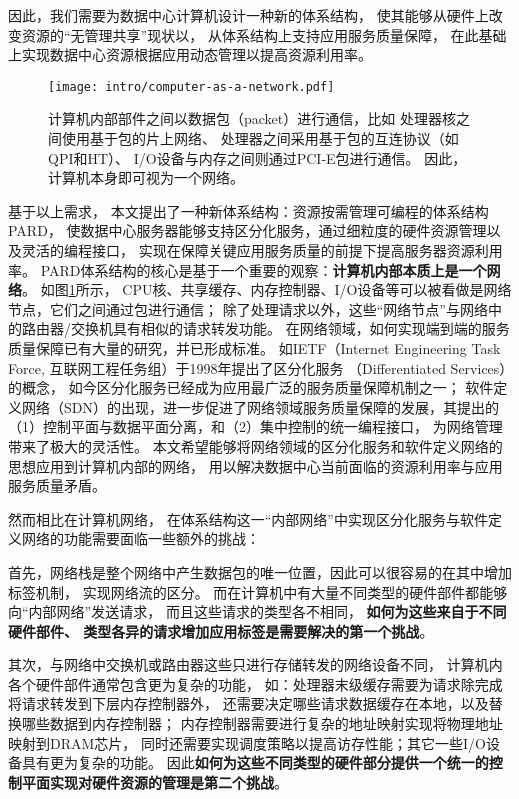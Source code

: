 因此，我们需要为数据中心计算机设计一种新的体系结构，
使其能够从硬件上改变资源的``无管理共享''现状以，
从体系结构上支持应用服务质量保障，
在此基础上实现数据中心资源根据应用动态管理以提高资源利用率。

\begin{figure}[H]
  \centering
  \texttt{[image: intro/computer-as-a-network.pdf]}
  \caption[计算机内部本质是一个网络]{
    计算机内部部件之间以数据包（packet）进行通信，比如
    处理器核之间使用基于包的片上网络、
    处理器之间采用基于包的互连协议（如QPI和HT）、
    I/O设备与内存之间则通过PCI-E包进行通信。
    因此，计算机本身即可视为一个网络。}
  \label{fig:computer-as-a-network}
\end{figure}

基于以上需求，
本文提出了一种新体系结构：资源按需管理可编程的体系结构PARD\cite{pard:2015}，
使数据中心服务器能够支持区分化服务，通过细粒度的硬件资源管理以及灵活的编程接口，
实现在保障关键应用服务质量的前提下提高服务器资源利用率。
PARD体系结构的核心是基于一个重要的观察：\textbf{计算机内部本质上是一个网络}。
如图\ref{fig:computer-as-a-network}所示，
CPU核、共享缓存、内存控制器、I/O设备等可以被看做是网络节点，它们之间通过包进行通信；
除了处理请求以外，这些``网络节点''与网络中的路由器/交换机具有相似的请求转发功能。
在网络领域，如何实现端到端的服务质量保障已有大量的研究，并已形成标准。
如IETF（Internet Engineering Task Force, 互联网工程任务组）于1998年提出了区分化服务
（Differentiated Services）\cite{DiffServ}的概念，
如今区分化服务已经成为应用最广泛的服务质量保障机制之一；
软件定义网络（SDN）\cite{SDN}的出现，进一步促进了网络领域服务质量保障的发展，其提出的
（1）控制平面与数据平面分离，和（2）集中控制的统一编程接口，
为网络管理带来了极大的灵活性。
本文希望能够将网络领域的区分化服务和软件定义网络的思想应用到计算机内部的网络，
用以解决数据中心当前面临的资源利用率与应用服务质量矛盾。

然而相比在计算机网络，
在体系结构这一``内部网络''中实现区分化服务与软件定义网络的功能需要面临一些额外的挑战：

首先，网络栈是整个网络中产生数据包的唯一位置，因此可以很容易的在其中增加标签机制，
实现网络流的区分。
而在计算机中有大量不同类型的硬件部件都能够向``内部网络''发送请求，
而且这些请求的类型各不相同，
\textbf{如何为这些来自于不同硬件部件、
类型各异的请求增加应用标签是需要解决的第一个挑战}。

其次，与网络中交换机或路由器这些只进行存储转发的网络设备不同，
计算机内各个硬件部件通常包含更为复杂的功能，
如：处理器末级缓存需要为请求除完成将请求转发到下层内存控制器外，
还需要决定哪些请求数据缓存在本地，以及替换哪些数据到内存控制器；
内存控制器需要进行复杂的地址映射实现将物理地址映射到DRAM芯片，
同时还需要实现调度策略以提高访存性能；其它一些I/O设备具有更为复杂的功能。
因此\textbf{如何为这些不同类型的硬件部分提供一个统一的控制平面实现对硬件资源的管理是第二个挑战}。

